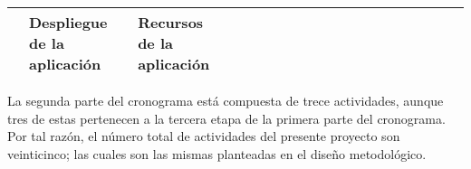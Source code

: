 \begin{table}[H]
\begin{adjustbox}{width={\textwidth},totalheight={\textheight},keepaspectratio}
\begin{tabular}{cp{10.555em}p{6.555em}rrrrrrrrrrrrrrrr}
    \cline{2-3}  & Despliegue de la aplicación & Recursos de la aplicación &   &   &   &   &   &   &   &   &   &   &   &   &   &   &   & \cellcolor[rgb]{ .988,  .894,  .839} \bigstrut\\
    \hline
    \end{tabular}%
    \end{adjustbox}
    \label{tab:crono2}
\end{table}

La segunda parte del cronograma está compuesta de trece actividades, aunque tres de estas pertenecen a la tercera etapa de la primera parte del cronograma. Por tal razón, el número total de actividades del presente proyecto son veinticinco; las cuales son las mismas planteadas en el diseño metodológico.
